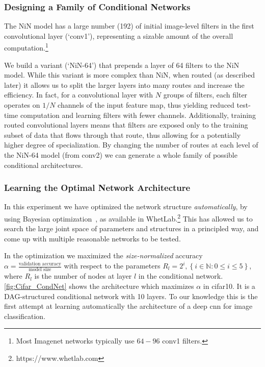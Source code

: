 \documentclass[thesis]{subfiles}
\begin{document}
	\subsubsection{Designing a Family of Conditional Networks}
	The NiN model has a large number (192) of initial image-level filters in the first convolutional layer (`conv1'), 
	representing a sizable amount of the overall computation.\footnote{Most Imagenet networks typically use $64-96$ conv1 filters.}
	
	We build a variant (`NiN-64') that prepends a layer of 64 filters to the NiN model.
	While this variant is more complex than NiN, when routed (as described later) it allows us 
	to split the larger layers into many routes and increase the efficiency.
	In fact, for a convolutional layer with $N$ groups of filters, each filter operates on $1/N$ channels of the input feature map, thus yielding reduced test-time computation and learning filters with fewer channels. 
	Additionally, training routed convolutional layers means that filters are exposed only to the training subset of data that flows through that route, thus allowing for a potentially higher degree of specialization.
	By changing the number of routes at each level of the NiN-64 model (from conv2) we can 
	generate a whole family of possible conditional architectures. 
	
	\subsubsection{Learning the Optimal Network Architecture}
	In this experiment we have optimized the network structure {\em automatically}, 
	by using Bayesian optimization~\citep{Snoek2012}, as available in WhetLab.\footnote{https://www.whetlab.com} 
	This has allowed us to search the large joint space of parameters and structures in a principled way, 
	and come up with multiple reasonable networks to be tested. 
	
	In the optimization we maximized the {\em size-normalized} accuracy $\alpha =\frac{\textrm{validation accuracy}}{\textrm{model size}}$ with respect to the parameters $R_l = 2^i, \left\{i\in \mathbb{N} : 0 \le i \le 5\right\}$, where $R_l$ is the number of nodes at layer $l$ in the conditional network. 
	\cref{fig:Cifar_CondNet} shows the architecture which maximizes $\alpha$ in \gls{cifar10}. 
	It is a DAG-structured conditional network with 10 layers.
	To our knowledge this is the first attempt at learning automatically the architecture of a deep \gls{cnn} for image classification.
	
\end{document}
